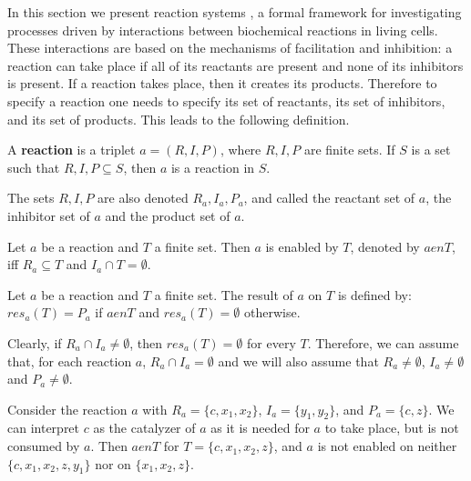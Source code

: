 In this section we present  reaction systems \cite{Rozenberg09Reaction}, a formal framework for investigating processes driven by interactions between biochemical reactions in living cells. These interactions are
based on the mechanisms of facilitation and inhibition: a reaction can take place if all of its reactants are present and none of its inhibitors is present. If a reaction takes place, then it creates its products. Therefore to specify a reaction one needs to specify its set of reactants, its set of inhibitors, and its set of products. This leads to the following definition.

\begin{definition}
  A {\bf reaction} is a triplet $a=(R,I,P)$, where $R, I, P$ are finite sets. If $S$ is a set such that $R,I,P\subseteq S$, then $a$ is a reaction in $S$.
\end{definition}

The sets $R, I, P$ are also denoted $R_a, I_a, P_a$, and called the reactant set of $a$, the inhibitor set of $a$ and the product set of $a$.

\begin{definition}
  Let $a$ be a reaction and $T$ a finite set. Then $a$ is enabled by $T$, denoted by $a \mathrel{en} T$, iff $R_a\subseteq T$ and $I_a\cap T = \emptyset$.
\end{definition}

\begin{definition}
  Let $a$ be a reaction and $T$ a finite set. The result of $a$ on $T$ is defined by: $res_a(T) = P_a$ if $a \mathrel{en} T$ and $res_a(T) = \emptyset$ otherwise.
\end{definition}

Clearly, if $R_a\cap I_a\neq\emptyset$, then $res_a(T)=\emptyset$ for every $T$. Therefore, we can assume that, for each reaction $a$, $R_a\cap I_a = \emptyset$ and we will also assume that $R_a\neq\emptyset$, $I_a\neq\emptyset$ and $P_a\neq\emptyset$.

\begin{example}
  Consider the reaction $a$ with $R_a = \{c, x_1, x_2\}$, $I_a = \{y_1, y_2\}$, and $P_a = \{c, z\}$. We can interpret $c$ as the catalyzer of $a$ as it is needed for $a$ to take place, but is not consumed by $a$. Then $a \mathrel{en} T$ for $T = \{c, x_1, x_2, z\}$, and $a$ is not enabled on neither $\{c, x_1, x_2, z, y_1\}$ nor on $\{x_1, x_2, z\}$.
\end{example}

